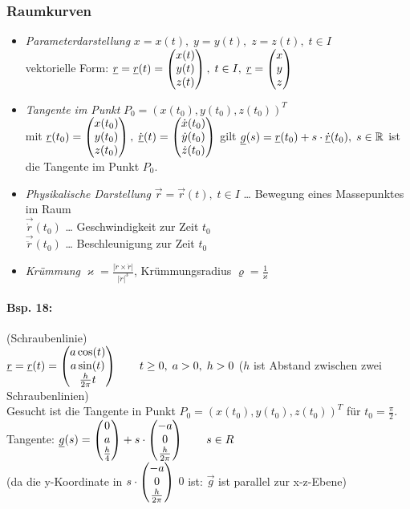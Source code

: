 \subsubsection{Raumkurven}
\begin{itemize}
\item \emph{Parameterdarstellung} $x=x(t),\;y=y(t), \;z=z(t), \;t \in I$\\
vektorielle Form: $\underline{r}=\underline{r}(t)=\begin{pmatrix}x(t)\\y(t)\\z(t)\end{pmatrix}, \; t \in I, \; \underline{r}=\begin{pmatrix}x\\ y \\ z\end{pmatrix}$
\item \emph{Tangente im Punkt} $P_0=(x(t_0),y(t_0),z(t_0))^T$\\
mit $\underline{r}(t_0)=\begin{pmatrix}x(t_0)\\y(t_0)\\z(t_0)\end{pmatrix}, \; \dot{\underline{r}}(t)=\begin{pmatrix}\dot{x}(t_0)\\\dot{y}(t_0)\\\dot{z}(t_0)\end{pmatrix}$ gilt $\underline{g}(s)=\underline{r}(t_0)+s\cdot \underline{\dot{r}}(t_0), \; s \in \mathbb{R}$ ist die Tangente im Punkt $P_0$.
\item \emph{Physikalische Darstellung} $\vec{r}=\vec{r}(t), \; t \in I$ … Bewegung eines Massepunktes im Raum\\
$\vec{\dot{r}}(t_0)$ … Geschwindigkeit zur Zeit $t_0$\\
$\vec{\ddot{r}}(t_0)$ … Beschleunigung zur Zeit $t_0$
\item \emph{Krümmung} $\varkappa = \frac{|\dot{r}\times \ddot{r}|}{|\dot{r}|^3}$, Krümmungsradius $\varrho=\frac{1}{\varkappa}$
\end{itemize}
\paragraph{Bsp. 18:} (Schraubenlinie)\\
$\underline{r}=\underline{r}(t)=\begin{pmatrix}a \cos (t)\\ a \sin (t) \\ \tfrac{h}{2\pi}t\end{pmatrix}\qquad t\geq 0, \; a>0, \; h>0$ ($h$ ist Abstand zwischen zwei Schraubenlinien)\\
Gesucht ist die Tangente in Punkt $P_0=(x(t_0), y(t_0), z(t_0))^T$ für $t_0=\frac{\pi}{2}$.\\
Tangente:
$\underline{g}(s)=\begin{pmatrix}0 \\ a \\ \tfrac{h}{4}\end{pmatrix}+s\cdot \begin{pmatrix}-a\\ 0 \\ \tfrac{h}{2\pi}\end{pmatrix}\qquad s \in R$\\ 
(da die y-Koordinate in $s\cdot \begin{pmatrix}-a\\ 0 \\ \tfrac{h}{2\pi}\end{pmatrix}$ $0$ ist: $\vec{g}$ ist parallel zur x-z-Ebene)

